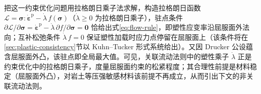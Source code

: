 把这一约束优化问题用拉格朗日乘子法求解，构造拉格朗日函数 $\mathcal{L}=\boldsymbol{\sigma}:\dot{\boldsymbol{\varepsilon}}^{\mathrm{p}}-\dot{\lambda}\,f(\boldsymbol{\sigma})$（$\dot{\lambda}\ge 0$ 为拉格朗日乘子），驻点条件 $\partial\mathcal{L}/\partial\boldsymbol{\sigma}=\dot{\boldsymbol{\varepsilon}}^{\mathrm{p}}-\dot{\lambda}\,\partial f/\partial\boldsymbol{\sigma}=\mathbf{0}$ 恰给出式\eqref{eq:flow-rule}，即塑性应变率沿屈服面外法向；互补松弛条件 $\dot{\lambda}\,f=0$ 保证塑性加载时应力点停留在屈服面上（该条件将在\ref{sec:plastic-consistency}节以 Kuhn–Tucker 形式系统给出）。又因 Drucker 公设蕴含屈服面外凸，该驻点即全局最大值。可见，关联流动法则中的塑性乘子 $\dot{\lambda}$ 正是约束优化中的拉格朗日乘子，度量屈服面约束的松紧程度；其合理性前提是材料稳定（屈服面外凸），对岩土等压强敏感材料该前提不再成立，从而引出下文的非关联流动法则。

